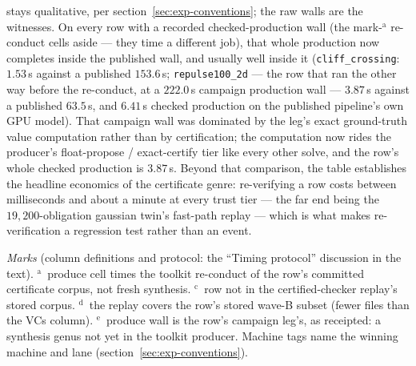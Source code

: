 stays qualitative, per section~\ref{sec:exp-conventions}; the raw
walls are the witnesses. On every row with a recorded checked-production
wall (the mark-$^{\text{a}}$ re-conduct cells aside --- they time a
different job), that whole production now completes inside the published wall, and
usually well inside it (\texttt{cliff\_crossing}: $1.53$\,s against a
published $153.6$\,s; \texttt{repulse100\_2d} --- the row that ran the
other way before the re-conduct, at a $222.0$\,s campaign production wall ---
$3.87$\,s against a published $63.5$\,s, and $6.41$\,s checked production
on the published pipeline's own GPU model). That campaign
wall was dominated by the leg's exact ground-truth value computation
rather than by certification; the computation now rides the
producer's float-propose / exact-certify tier like every other
solve, and the row's whole checked production is $3.87$\,s. Beyond
that comparison, the table establishes the headline economics of the
certificate genre: re-verifying a row costs between milliseconds and
about a minute at every trust tier --- the far end being the
$19{,}200$-obligation gaussian twin's fast-path replay --- which is
what makes re-verification a regression test rather than an event.

\begin{table}[htbp]
\centering\small


\smallskip
\begin{minipage}{0.96\linewidth}\footnotesize
\emph{Marks} (column definitions and protocol: the ``Timing protocol''
discussion in the text).
$^{\text{a}}$~produce cell times the toolkit re-conduct of the row's
committed certificate corpus, not fresh synthesis.
$^{\text{c}}$~row not in the certified-checker replay's stored corpus.
$^{\text{d}}$~the replay covers the row's stored wave-B subset (fewer
files than the VCs column).
$^{\text{e}}$~produce wall is the row's campaign leg's, as receipted: a
synthesis genus not yet in the toolkit producer.
Machine tags name the winning machine and lane
(section~\ref{sec:exp-conventions}).
\end{minipage}
\caption{Wall-clock walls, published pipeline vs.\ toolkit production
and replay tiers (seconds).}
\label{tab:exp-sweep-times}
\end{table}

